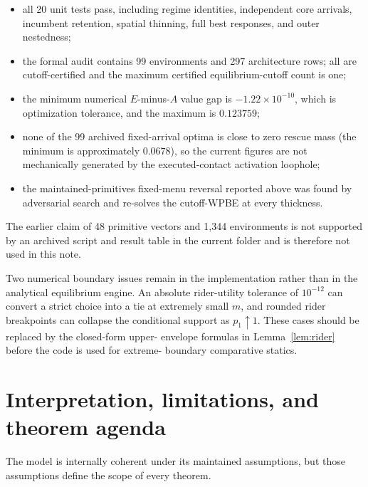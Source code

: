 \documentclass[11pt]{article}
\theoremstyle{definition}
\theoremstyle{remark}
\begin{document}
\begin{itemize}[leftmargin=1.6em]
\item all 20 unit tests pass, including regime identities, independent core
arrivals, incumbent retention, spatial thinning, full best responses, and
outer nestedness;
\item the formal audit contains 99 environments and 297 architecture rows;
all are cutoff-certified and the maximum certified equilibrium-cutoff count
is one;
\item the minimum numerical $E$-minus-$A$ value gap is
$-1.22\times10^{-10}$, which is optimization tolerance, and the maximum is
$0.123759$;
\item none of the 99 archived fixed-arrival optima is close to zero rescue
mass (the minimum is approximately $0.0678$), so the current figures are not
mechanically generated by the executed-contact activation loophole;
\item the maintained-primitives fixed-menu reversal reported above was found
by adversarial search and re-solves the cutoff-WPBE at every thickness.
\end{itemize}

The earlier claim of 48 primitive vectors and 1,344 environments is not
supported by an archived script and result table in the current folder and is
therefore not used in this note.

Two numerical boundary issues remain in the implementation rather than in the
analytical equilibrium engine.  An absolute rider-utility tolerance of
$10^{-12}$ can convert a strict choice into a tie at extremely small $m$, and
rounded rider breakpoints can collapse the conditional support as
$p_1\uparrow1$.  These cases should be replaced by the closed-form upper-
envelope formulas in Lemma~\ref{lem:rider} before the code is used for extreme-
boundary comparative statics.

\section{Interpretation, limitations, and theorem agenda}

The model is internally coherent under its maintained assumptions, but those
assumptions define the scope of every theorem.
\end{document}
